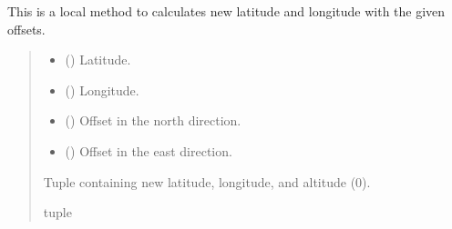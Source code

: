 \documentclass[letterpaper,10pt,english]{sphinxmanual}
\begin{document}
\begin{fulllineitems}
\label{\detokenize{index:georef.Geotagger.lat_long}}
\pysigstartsignatures
{}
\pysigstopsignatures
\sphinxAtStartPar
This is a local method to calculates new latitude and longitude with the given offsets.
\begin{quote}\begin{description}
\begin{itemize}
\item {} 
\sphinxAtStartPar
{} () \textendash{} Latitude.

\item {} 
\sphinxAtStartPar
{} () \textendash{} Longitude.

\item {} 
\sphinxAtStartPar
{} () \textendash{} Offset in the north direction.

\item {} 
\sphinxAtStartPar
{} () \textendash{} Offset in the east direction.

\end{itemize}

\sphinxAtStartPar
Tuple containing new latitude, longitude, and altitude (0).

\sphinxAtStartPar
tuple

\end{description}\end{quote}

\end{fulllineitems}

\end{document}

